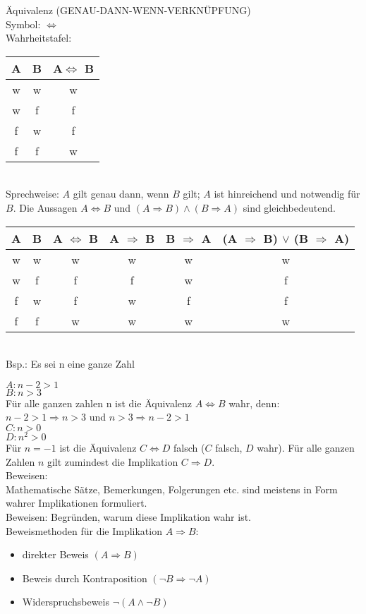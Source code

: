 \documentclass[10pt,a4paper,numbers=endperiod]{scrartcl}
\theoremstyle{definition}
\begin{document}
Äquivalenz (GENAU-DANN-WENN-VERKNÜPFUNG)\\
Symbol: $\Leftrightarrow$\\
Wahrheitstafel: 
\begin{tabular}{c|c|c}
	A & B & A$\Leftrightarrow$ B \\
	\hline
	w & w & w \\
	w & f & f \\
	f & w & f \\
	f & f & w \\
\end{tabular}\\


Sprechweise: $A$ gilt genau dann, wenn $B$ gilt; $A$ ist hinreichend und notwendig für $B$. Die Aussagen $A \Leftrightarrow B$ und $(A \Rightarrow B) \wedge (B \Rightarrow A)$ sind gleichbedeutend.\\

\begin{tabular}{c|c|c|c|c|c}
	A & B & A $\Leftrightarrow$ B & A $\Rightarrow$ B & B $\Rightarrow$ A & (A $\Rightarrow$ B) $\vee$ (B $\Rightarrow$ A) \\
	\hline
	w & w & w & w & w & w \\
	w & f & f & f & w & f \\
	f & w & f & w & f & f \\
	f & f & w & w & w & w \\
\end{tabular}\\

Bsp.: Es sei n eine ganze Zahl 

$A: n-2>1$\\
$B: n>3$\\
Für alle ganzen zahlen n ist die Äquivalenz $A \Leftrightarrow B$ wahr, denn:\\
$n-2>1 \Rightarrow n>3$ und $n>3 \Rightarrow n-2>1$\\
$C: n>0$\\
$D: n^2>0$\\
Für $n=-1$ ist die Äquivalenz $C \Leftrightarrow D$ falsch ($C$ falsch, $D$ wahr). Für alle ganzen Zahlen $n$ gilt zumindest die Implikation $C \Rightarrow D$.\\

Beweisen:\\
Mathematische Sätze, Bemerkungen, Folgerungen etc. sind meistens in Form wahrer Implikationen formuliert.\\
Beweisen: Begründen, warum diese Implikation wahr ist.\\
Beweismethoden für die Implikation $A \Rightarrow B$: 
\begin{itemize}
\item direkter Beweis $(A \Rightarrow B)$
\item Beweis durch Kontraposition $(\neg B \Rightarrow \neg A)$
\item Widerspruchsbeweis $\neg(A \wedge \neg B)$
\end{itemize}
\end{document}
